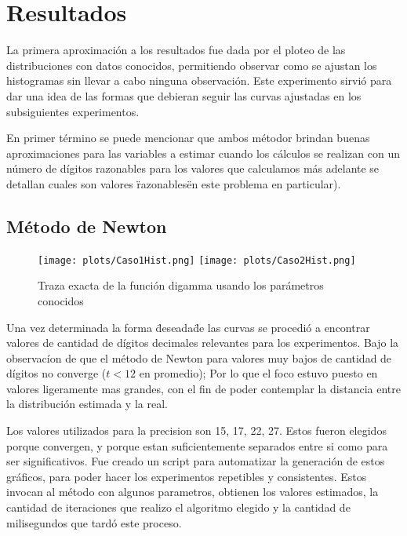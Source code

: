 \section{Resultados}

La primera aproximaci\'on a los resultados fue dada por el ploteo de las 
distribuciones con datos conocidos, permitiendo observar como se ajustan los 
histogramas sin llevar a cabo ninguna observaci\'on. 
Este experimento sirvi\'o para dar una idea de las formas que debieran seguir 
las curvas ajustadas en los subsiguientes experimentos.

En primer t\'ermino se puede mencionar que ambos m\'etodor brindan buenas
aproximaciones para las variables a estimar cuando los c\'alculos se realizan
con un n\'umero de d\'igitos razonables para los valores que calculamos m\'as
adelante se detallan cuales son valores \"razonables\" en este problema en
particular).

\subsection{M\'etodo de Newton}

\begin{figure} [H]
\begin {center}
\texttt{[image: plots/Caso1Hist.png]}
\texttt{[image: plots/Caso2Hist.png]}
\end {center}
\caption{Traza exacta de la funci\'on digamma usando los par\'ametros conocidos}
\label{fig:FitCaso3Newton}
\end{figure}

Una vez determinada la forma \"deseada\" de las curvas se procedi\'o a encontrar
valores de cantidad de d\'igitos decimales relevantes para los experimentos. 
Bajo la observac\'ion de que el m\'etodo de Newton para valores muy bajos de 
cantidad de d\'igitos no converge ($t < 12$ en promedio); Por lo que el foco
estuvo puesto en valores ligeramente mas grandes, con el fin de poder contemplar
la distancia entre la distribuci\'on estimada y la real.

Los valores utilizados para la precision son 15, 17, 22, 27. 
Estos fueron elegidos porque convergen, y porque estan suficientemente separados
entre si como para ser significativos. Fue creado un script para automatizar la 
generaci\'on de estos gr\'aficos, para poder hacer los experimentos repetibles 
y consistentes. Estos invocan al m\'etodo con algunos parametros, 
obtienen los valores estimados, la cantidad de iteraciones que realizo el 
algoritmo elegido y la cantidad de milisegundos que tard\'o este proceso.

